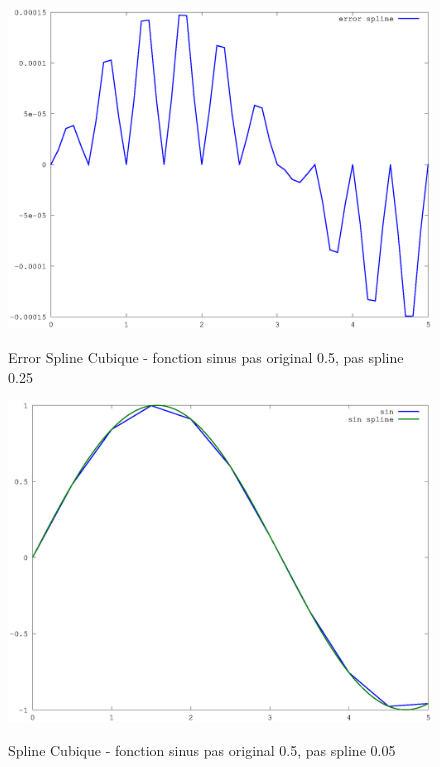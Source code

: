 \documentclass[a4paper,11pt]{article}
\begin{document}
\begin{figure}[h!]
  \begin{centering}
    \includegraphics[scale=0.5]{../sinus_5_error}
    \label{rspro2}
    \par\end{centering}
  \caption{Error Spline Cubique - fonction sinus pas original 0.5, pas spline 0.25}
  \label{fig:jacobi-conv}
\end{figure}

\begin{figure}[h!]
  \begin{centering}
    \includegraphics[scale=0.5]{../sinus_10}
    \label{rspro2}
    \par\end{centering}
  \caption{Spline Cubique - fonction sinus pas original 0.5, pas spline 0.05}
  \label{fig:jacobi-conv}
\end{figure}
\end{document}
